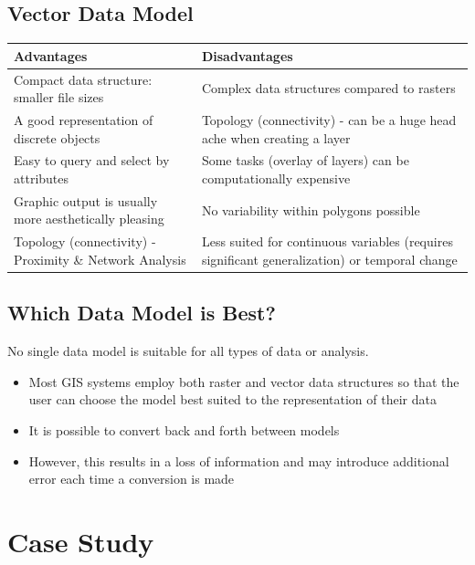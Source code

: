 \documentclass[
]{book}
\providecommand{\tightlist}{%
  \setlength{\itemsep}{0pt}\setlength{\parskip}{0pt}}
\begin{document}
\hypertarget{vector-data-model}{%
\subsection{Vector Data Model}\label{vector-data-model}}

\begin{longtable}[]{@{}
  >{\raggedright\arraybackslash}p{}
  >{\raggedright\arraybackslash}p{}@{}}
\toprule
Advantages & Disadvantages \\
\midrule
\endhead
Compact data structure: smaller file sizes & Complex data structures compared to rasters \\
A good representation of discrete objects & Topology (connectivity) - can be a huge head ache when creating a layer \\
Easy to query and select by attributes & Some tasks (overlay of layers) can be computationally expensive \\
Graphic output is usually more aesthetically pleasing & No variability within polygons possible \\
Topology (connectivity) - Proximity \& Network Analysis & Less suited for continuous variables (requires significant generalization) or temporal change \\
\bottomrule
\end{longtable}

\hypertarget{which-data-model-is-best}{%
\subsection{Which Data Model is Best?}\label{which-data-model-is-best}}

No single data model is suitable for all types of data or analysis.

\begin{itemize}
\tightlist
\item
  Most GIS systems employ both raster and vector data structures so that the user can choose the model best suited to the representation of their data
\item
  It is possible to convert back and forth between models
\item
  However, this results in a loss of information and may introduce additional error each time a conversion is made
\end{itemize}

\hypertarget{case-study}{%
\section{Case Study}\label{case-study}}
\end{document}
